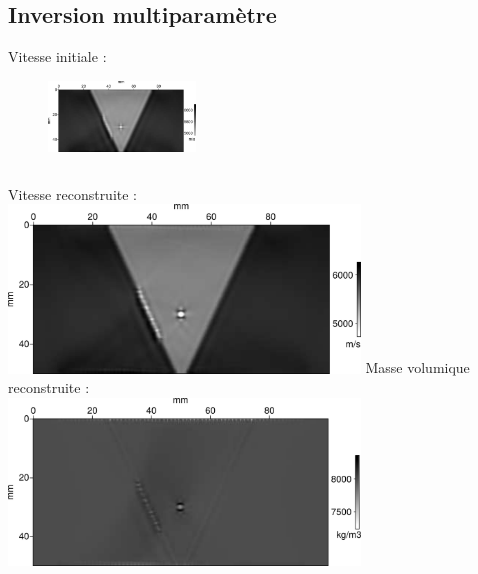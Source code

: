 \documentclass[10pt,xcolor=x11names,compress, notes=show]{beamer}%
\begin{document}
\subsection{Inversion multiparamètre}
\begin{frame}{\insertsectionhead}
	\centering
	Vitesse initiale :
	\begin{figure}
		\centering
		\includegraphics[width=0.35\textwidth]{img/vp_mono_smooth/vp_smooth.png}\\
	\end{figure}
	
	\begin{columns}
		\centering
		Vitesse reconstruite :\\[0.2cm]
		\includegraphics[width=0.7\textwidth]{img/multi/vp_multi_6000k.png}		
		\centering
		Masse volumique reconstruite :\\[0.2cm]
		\includegraphics[width=0.7\textwidth]{img/multi/rho_6000k.png}	
	\end{columns}
	
	\begin{columns}
		\column{}
	
	\end{columns}
	
	
	
	

\end{frame}
\end{document}
